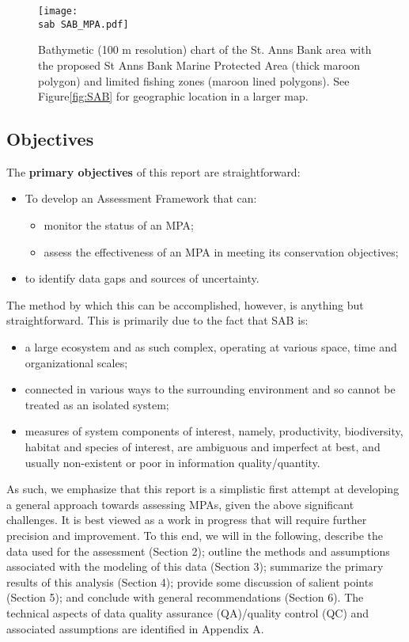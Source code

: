 \documentclass[letterpaper,portrait,11pt]{scrartcl}
\numberwithin{equation}{section}		%
\numberwithin{figure}{section}		%
\numberwithin{table}{section}				%
\newcommand{\ecomod}{\string~/ecomod_data/}   %
\newcommand{\sab}{\ecomod/mpa/sab/}   %
\newcommand{\analysis}{\ecomod/mpa/analysis/}   %
\begin{document}
\begin{figure}[h]

  \centering
  \texttt{[image: \\sab SAB\_MPA.pdf]}
  \caption{Bathymetic (100 m resolution) chart of the  St. Anns Bank area with the proposed St Anns Bank Marine Protected Area (thick maroon polygon) and limited fishing zones (maroon lined polygons). See Figure\ref{fig:SAB} for geographic location in a larger map.}
    \label{fig:SABCloseup}
\end{figure}

\subsection{Objectives}

The \textbf{primary objectives} of this report are straightforward:

\begin{itemize}
	\item To develop an Assessment Framework that can:
  \begin{itemize}
    \item	monitor the status of an MPA;
  	\item assess the effectiveness of an MPA in meeting its conservation objectives;
  \end{itemize}
  \item to identify data gaps and sources of uncertainty. 
\end{itemize}

The method by which this can be accomplished, however, is anything but straightforward. This is primarily due to the fact that SAB is:

\begin{itemize}
	\item a large ecosystem and as such complex, operating at various space, time and organizational scales;
	\item connected in various ways to the surrounding environment and so cannot be treated as an isolated system;
	\item measures of system components of interest, namely, productivity, biodiversity, habitat and species of interest, are ambiguous and imperfect at best, and usually non-existent or poor in information quality/quantity.
\end{itemize}


As such, we emphasize that this report is a simplistic first attempt at developing a general approach towards assessing MPAs, given the above significant challenges. It is best viewed as a work in progress that will require further precision and improvement. To this end, we will in the following, describe the data used for the assessment (Section 2); outline the methods and assumptions associated with the modeling of this data (Section 3); summarize the primary results of this analysis (Section 4); provide some discussion of salient points (Section 5); and conclude with general recommendations (Section 6). The technical aspects of data quality assurance (QA)/quality control (QC) and associated assumptions are identified in Appendix A. 
\end{document}
